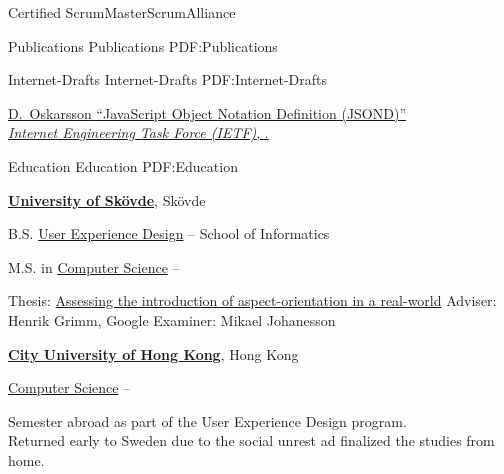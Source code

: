 \documentclass[letterpaper,MMMyyyy,nonstopmode]{resume}
\begin{document}
\begin{Body}
\BulletItem
Certified ScrumMaster\newline ScrumAlliance
\hfill
{}

\newpage


\Section
{Publications}
{Publications}
{PDF:Publications}

\SubSection
{Internet-Drafts}
{Internet-Drafts}
{PDF:Internet-Drafts}

\begingroup
\renewcommand{\MaxNumberedItem}{[88]}

\BigGap
\BulletItem
\href{https://www.ietf.org/archive/id/draft-oskarsson-jsond-00.txt}
{\underline{D.~Oskarsson}
``JavaScript Object Notation Definition (JSOND)''\\
\textit{Internet Engineering Task Force (IETF)}, .}

\endgroup


\Section
{Education}
{Education}
{PDF:Education}

\Entry
\href{http://www.example.com/my-university}
{\textbf{University of Skövde}},
Skövde

\Gap
\BulletItem
B.S.
\href{http://www.his.se/uxd}
{User Experience Design}
\hfill
{} --
\newline
School of Informatics



\Gap
\BulletItem
M.S. in
\href{http://his.se/dvp}
{Computer Science}
\hfill
{} --
\begin{Detail}
\SubBulletItem
Thesis:
\href{http://urn.kb.se/resolve?urn=urn:nbn:se:his:diva-13461}
{Assessing the introduction of aspect-orientation in a real-world}
\SubBulletItem
Adviser:
Henrik Grimm, Google
\SubBulletItem
Examiner:
Mikael Johanesson
\end{Detail}
    
\BigGap
\Entry
\href{http://cityu.edu.hk}
{\textbf{City University of Hong Kong}}, Hong Kong

\Gap
\BulletItem
\href{https://cs.cityu.edu.hk/courses/exchange.html}
{Computer Science}
\hfill
{} --
\begin{Detail}
\SubBulletItem
Semester abroad as part of the User Experience Design program.\\Returned early to Sweden due to the social unrest ad finalized the studies from home.
\end{Detail}


\end{Body}
\end{document}

